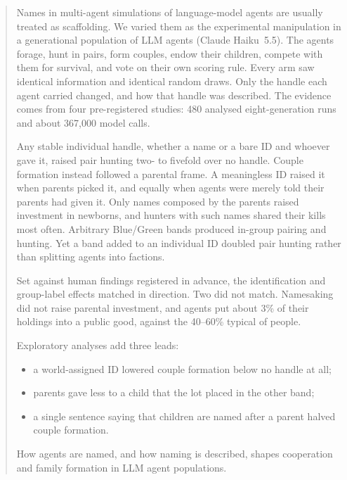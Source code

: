 \begin{abstract}
Names in multi-agent simulations of language-model agents are usually treated as scaffolding.
We varied them as the experimental manipulation in a generational population of LLM agents
(Claude Haiku~5.5). The agents forage, hunt in pairs, form couples, endow their children, compete
with them for survival, and vote on their own scoring rule. Every arm saw identical information
and identical random draws. Only the handle each agent carried changed, and how that handle was
described. The evidence comes from four pre-registered studies: 480 analysed eight-generation
runs and about 367,000 model calls.

Any stable individual handle, whether a name or a bare ID and whoever gave it, raised pair
hunting two- to fivefold over no handle. Couple formation instead followed a parental frame. A
meaningless ID raised it when parents picked it, and equally when agents were merely told their
parents had given it. Only names composed by the parents raised investment in newborns, and
hunters with such names shared their kills most often. Arbitrary Blue/Green bands produced
in-group pairing and hunting. Yet a band added to an individual ID doubled pair hunting rather
than splitting agents into factions.

Set against human findings registered in advance, the identification and group-label effects
matched in direction. Two did not match. Namesaking did not raise parental investment, and agents
put about 3\% of their holdings into a public good, against the 40--60\% typical of people.

Exploratory analyses add three leads:
\begin{itemize}
  \item a world-assigned ID lowered couple formation below no handle at all;
  \item parents gave less to a child that the lot placed in the other band;
  \item a single sentence saying that children are named after a parent halved couple formation.
\end{itemize}

How agents are named, and how naming is described, shapes cooperation and family formation in
LLM agent populations.
\end{abstract}
